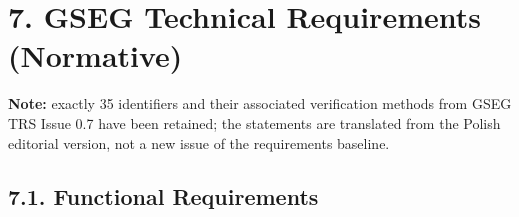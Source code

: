 \section{7. GSEG Technical Requirements (Normative)}\label{gseg-technical-requirements}

\textbf{Note:} exactly 35 identifiers and their associated verification methods from GSEG TRS Issue 0.7 have been retained; the statements are translated from the Polish editorial version, not a new issue of the requirements baseline.

\subsection{7.1. Functional Requirements}\label{functional-and-mission-requirements}

\begingroup{}
